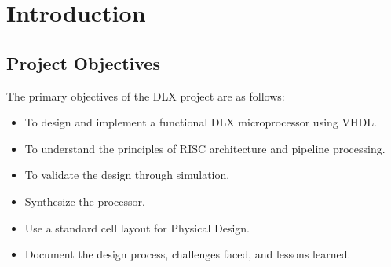 \chapter{Introduction}

\section{Project Objectives}
The primary objectives of the DLX project are as follows:
\begin{itemize}
    \item To design and implement a functional DLX microprocessor using VHDL.
    \item To understand the principles of RISC architecture and pipeline processing.
    \item To validate the design through simulation.
    \item Synthesize the processor.
    \item Use a standard cell layout for Physical Design.
    \item Document the design process, challenges faced, and lessons learned.
\end{itemize}

